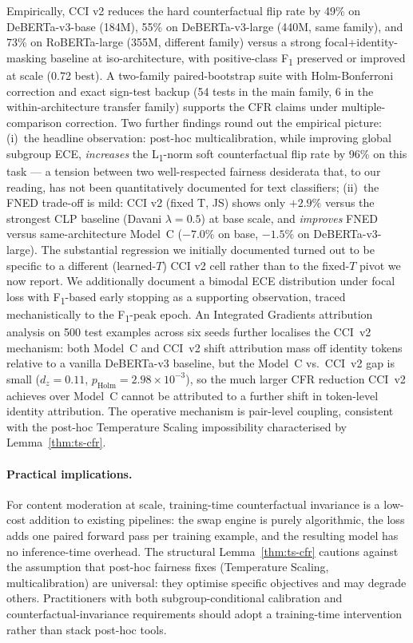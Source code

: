 \documentclass[10pt,a4paper]{article}
\begin{document}
Empirically, CCI v2 reduces the hard counterfactual flip rate by 49\% on DeBERTa-v3-base (184M), 55\% on DeBERTa-v3-large (440M, same family), and 73\% on RoBERTa-large (355M, different family) versus a strong focal+identity-masking baseline at iso-architecture, with positive-class F\textsubscript{1} preserved or improved at scale (0.72 best). A two-family paired-bootstrap suite with Holm-Bonferroni correction and exact sign-test backup (54 tests in the main family, 6 in the within-architecture transfer family) supports the CFR claims under multiple-comparison correction. Two further findings round out the empirical picture: (i)~the headline observation: post-hoc multicalibration, while improving global subgroup ECE, \emph{increases} the L\textsubscript{1}-norm soft counterfactual flip rate by 96\% on this task --- a tension between two well-respected fairness desiderata that, to our reading, has not been quantitatively documented for text classifiers; (ii)~the FNED trade-off is mild: CCI v2 (fixed T, JS) shows only $+2.9\%$ versus the strongest CLP baseline (Davani $\lambda{=}0.5$) at base scale, and \emph{improves} FNED versus same-architecture Model~C ($-7.0\%$ on base, $-1.5\%$ on DeBERTa-v3-large). The substantial regression we initially documented turned out to be specific to a different (learned-$T$) CCI v2 cell rather than to the fixed-$T$ pivot we now report. We additionally document a bimodal ECE distribution under focal loss with F\textsubscript{1}-based early stopping as a supporting observation, traced mechanistically to the F\textsubscript{1}-peak epoch. An Integrated Gradients attribution analysis on 500 test examples across six seeds further localises the CCI~v2 mechanism: both Model~C and CCI~v2 shift attribution mass off identity tokens relative to a vanilla DeBERTa-v3 baseline, but the Model~C vs.\ CCI~v2 gap is small ($d_z = 0.11$, $p_{\mathrm{Holm}} = 2.98{\times}10^{-3}$), so the much larger CFR reduction CCI~v2 achieves over Model~C cannot be attributed to a further shift in token-level identity attribution. The operative mechanism is pair-level coupling, consistent with the post-hoc Temperature Scaling impossibility characterised by Lemma~\ref{thm:ts-cfr}.

\paragraph{Practical implications.}
For content moderation at scale, training-time counterfactual invariance is a low-cost addition to existing pipelines: the swap engine is purely algorithmic, the loss adds one paired forward pass per training example, and the resulting model has no inference-time overhead. The structural Lemma~\ref{thm:ts-cfr} cautions against the assumption that post-hoc fairness fixes (Temperature Scaling, multicalibration) are universal: they optimise specific objectives and may degrade others. Practitioners with both subgroup-conditional calibration and counterfactual-invariance requirements should adopt a training-time intervention rather than stack post-hoc tools.
\end{document}
